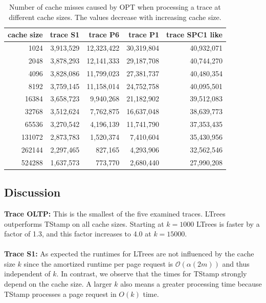 \documentclass[a4paper,12pt, titlepage]{article}  %
\newcommand{\oh}{\mathcal{O}}   %
\begin{document}
\begin{table}[p]
	\centering
	\begin{tabular}{|r||r|r|r|r|}
	  	\hline
                cache size                               &    trace S1             &  trace P6         &      trace P1          &  trace SPC1 like   \\
                \hline
                1024			                    &      3,913,529           &       12,323,422   &   30,319,804    &   40,932,071 \\
		2048					     &     3,878,293           &      12,141,333   &    29,187,708    &   40,744,270 \\								
		4096					     &     3,828,086            &      11,799,023   &   27,381,737    &   40,480,354  \\	
		8192					     &     3,759,145           &       11,158,014   &   24,752,758    &   40,095,501  \\	
		16384				     &     3,658,723           &       9,940,268     &  21,182,902     &   39,512,083 \\	
		32768				     &     3,512,624           &       7,762,875    &   16,637,048     &    38,639,773 \\	
		65536				     &     3,270,542           &       4,196,139    &   11,741,790    &    37,353,435  \\	
		131072				     &     2,873,783           &       1,520,374    &   7,410,604      &    35,430,956 \\	
		262144				     &     2,297,465           &          827,165    &   4,293,906      &    32,562,546 \\	
		524288				     &     1,637,573           &          773,770    &   2,680,440      &    27,990,208 \\
                \hline
	\end{tabular}
	\caption{Number of cache misses caused by OPT when processing a trace at different cache sizes.
                     The values decrease with increasing cache size.}
        \label{tab:cacheMissesTraces}
\end{table}


\newpage

\subsection{Discussion}
\textbf{Trace OLTP:} This is the smallest of the five examined traces. LTrees outperforms TStamp 
on all cache sizes. Starting at $k=1000$ LTrees is faster by a factor of 1.3, and this factor increases to 4.0
at $k=15000$.\\
\\
\textbf{Trace S1:} As expected the runtimes for LTrees are not influenced by the cache size $k$
since the amortized runtime per page request is $\oh(\alpha(2m))$ and thus independent of $k$.
In contrast, we observe that the times for TStamp strongly depend on the cache size. A larger $k$
also means a greater processing time because TStamp processes a page request in $O(k)$ time.
\end{document}
